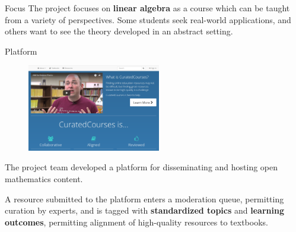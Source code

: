 \begin{sectionblock}{Focus}
  The project focuses on \textbf{linear algebra} as a course which can
  be taught from a variety of perspectives.  Some students seek
  real-world applications, and others want to see the theory developed
  in an abstract setting.

\end{sectionblock}

\begin{sectionblock}{Platform}

  \begin{figure}
    \includegraphics[width=0.52\textwidth]{landing-page.png}
  \end{figure}

  The project team developed a platform for disseminating and hosting 
  open mathematics content.

  \vspace{1ex}A resource submitted to the platform enters a moderation queue,
  permitting curation by experts, and is tagged with
  \textbf{standardized topics} and \textbf{learning outcomes},
  permitting alignment of high-quality resources to textbooks.
\end{sectionblock}